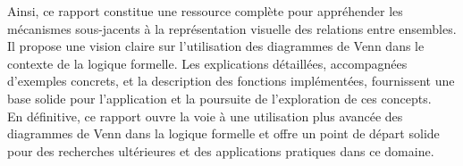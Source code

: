 \documentclass{article}
\begin{document}
Ainsi, ce rapport constitue une ressource complète pour appréhender les mécanismes sous-jacents à la représentation visuelle des relations entre ensembles. Il propose une vision claire sur l'utilisation des diagrammes de Venn dans le contexte de la logique formelle. Les explications détaillées, accompagnées d'exemples concrets, et la description des fonctions implémentées, fournissent une base solide pour l'application et la poursuite de l'exploration de ces concepts.\\

En définitive, ce rapport ouvre la voie à une utilisation plus avancée des diagrammes de Venn dans la logique formelle et offre un point de départ solide pour des recherches ultérieures et des applications pratiques dans ce domaine.
\end{document}

